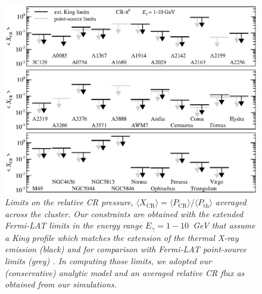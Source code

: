\documentclass[10pt,aps,pra,reprint,amsmath,amsfonts,amssymb,showpacs,nofootinbib,floatfix]{revtex4-1}
\newcommand{\Fermi}{{\em Fermi}\xspace}
\newcommand{\rmn}{\mathrm}
\newcommand{\bra}{\langle}
\newcommand{\ket}{\rangle}
\begin{document}
\begin{figure}
\begin{minipage}{2.0\columnwidth}
  \includegraphics[width=0.99\columnwidth]{figures/XCR.Fermi.eps}
  \caption{\it Limits on the relative CR pressure, $\bra
    X_\rmn{CR}\ket = \bra P_\rmn{CR} \ket / \bra P_\rmn{th}\ket$
    averaged across the cluster. Our constraints are obtained with the
    extended \Fermi-LAT limits in the energy range $E_\gamma=1-10$~GeV
    that assume a King profile which matches the extension of the
    thermal X-ray emission (black) and for comparison with \Fermi-LAT
    point-source limits (grey) \cite{2010ApJ...717L..71A}. In
    computing those limits, we adopted our (conservative) analytic
    model \cite{2010MNRAS.409..449P} and an averaged relative CR flux
    as obtained from our simulations.}
 \label{fig:XCR}
\end{minipage}
\end{figure}
\end{document}
